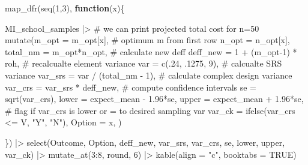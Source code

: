 \documentclass[
  12pt]{article}
\newenvironment{Shaded}{\begin{snugshade}}{\end{snugshade}}
\newcommand{\AttributeTok}[1]{\textcolor[rgb]{0.40,0.45,0.13}{#1}}
\newcommand{\CommentTok}[1]{\textcolor[rgb]{0.37,0.37,0.37}{#1}}
\newcommand{\ConstantTok}[1]{\textcolor[rgb]{0.56,0.35,0.01}{#1}}
\newcommand{\ControlFlowTok}[1]{\textcolor[rgb]{0.00,0.23,0.31}{\textbf{#1}}}
\newcommand{\DecValTok}[1]{\textcolor[rgb]{0.68,0.00,0.00}{#1}}
\newcommand{\FloatTok}[1]{\textcolor[rgb]{0.68,0.00,0.00}{#1}}
\newcommand{\FunctionTok}[1]{\textcolor[rgb]{0.28,0.35,0.67}{#1}}
\newcommand{\NormalTok}[1]{\textcolor[rgb]{0.00,0.23,0.31}{#1}}
\newcommand{\SpecialCharTok}[1]{\textcolor[rgb]{0.37,0.37,0.37}{#1}}
\newcommand{\StringTok}[1]{\textcolor[rgb]{0.13,0.47,0.30}{#1}}
\begin{document}
\begin{Shaded}
\begin{Highlighting}[]
\FunctionTok{map\_dfr}\NormalTok{(}\FunctionTok{seq}\NormalTok{(}\DecValTok{1}\NormalTok{,}\DecValTok{3}\NormalTok{), }\ControlFlowTok{function}\NormalTok{(x)\{}
  
\NormalTok{  MI\_school\_samples }\SpecialCharTok{|\textgreater{}} 
  \CommentTok{\# we can print projected total cost for n=50}
  \FunctionTok{mutate}\NormalTok{(}\AttributeTok{m\_opt =}\NormalTok{ m\_opt[x], }\CommentTok{\# optimum m from first row}
         \AttributeTok{n\_opt =}\NormalTok{ n\_opt[x],}
         \AttributeTok{total\_nm =}\NormalTok{ m\_opt}\SpecialCharTok{*}\NormalTok{n\_opt,}
         \CommentTok{\# calculate new deff}
         \AttributeTok{deff\_new =} \DecValTok{1} \SpecialCharTok{+}\NormalTok{ (m\_opt}\DecValTok{{-}1}\NormalTok{) }\SpecialCharTok{*}\NormalTok{ roh,}
         \CommentTok{\# recalcualte element variance}
         \AttributeTok{var =} \FunctionTok{c}\NormalTok{(.}\DecValTok{24}\NormalTok{, .}\DecValTok{1275}\NormalTok{, }\DecValTok{9}\NormalTok{),}
         \CommentTok{\# calcualte SRS variance}
         \AttributeTok{var\_srs =}\NormalTok{  var }\SpecialCharTok{/}\NormalTok{ (total\_nm }\SpecialCharTok{{-}} \DecValTok{1}\NormalTok{),}
         \CommentTok{\# calculate complex design variance}
         \AttributeTok{var\_crs =}\NormalTok{ var\_srs }\SpecialCharTok{*}\NormalTok{ deff\_new,}
          \CommentTok{\# compute confidence intervals}
         \AttributeTok{se =} \FunctionTok{sqrt}\NormalTok{(var\_crs),}
         \AttributeTok{lower =}\NormalTok{ expect\_mean  }\SpecialCharTok{{-}} \FloatTok{1.96}\SpecialCharTok{*}\NormalTok{se,}
         \AttributeTok{upper =}\NormalTok{ expect\_mean }\SpecialCharTok{+} \FloatTok{1.96}\SpecialCharTok{*}\NormalTok{se,}
        \CommentTok{\# flag if var\_crs is lower or = to desired sampling var}
         \AttributeTok{var\_ck =} \FunctionTok{ifelse}\NormalTok{(var\_crs }\SpecialCharTok{\textless{}=}\NormalTok{ V, }\StringTok{"Y"}\NormalTok{, }\StringTok{"N"}\NormalTok{),}
        \AttributeTok{Option =}\NormalTok{ x,}
\NormalTok{  ) }
    
  
\NormalTok{\}) }\SpecialCharTok{|\textgreater{}} 
  \FunctionTok{select}\NormalTok{(Outcome, Option, deff\_new, var\_srs, var\_crs, se, lower, upper, var\_ck) }\SpecialCharTok{|\textgreater{}} 
  \FunctionTok{mutate\_at}\NormalTok{(}\DecValTok{3}\SpecialCharTok{:}\DecValTok{8}\NormalTok{, round, }\DecValTok{6}\NormalTok{) }\SpecialCharTok{|\textgreater{}} 
  \FunctionTok{kable}\NormalTok{(}\AttributeTok{align =} \StringTok{"c"}\NormalTok{, }\AttributeTok{booktabs =} \ConstantTok{TRUE}\NormalTok{) }
\end{Highlighting}
\end{Shaded}
\end{document}
